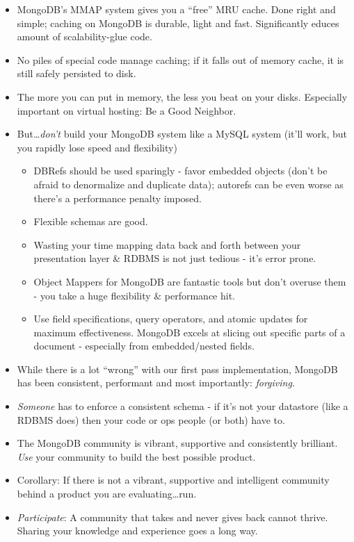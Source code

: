 \documentclass{beamer}
\newenvironment{itemizeframe}
               {\begin{frame}\startitemizeframe} 
               {\stopitemizeframe\end{frame}}
\newenvironment{itemizecodeframe}
              {\begin{frame}[allowframebreaks,allowdisplaybreaks]
              \startitemizeframe} 
              {\stopitemizeframe\end{frame}}
\newcommand\startitemizeframe{\begin{itemize}} \newcommand\stopitemizeframe{\end{itemize}}
\begin{document}
\begin{itemizecodeframe}
    \frametitle{As long as I'm being hyperbolic\ldots}
    \framesubtitle{MongoDB is a bionic leg replacement\ldots}
	\item MongoDB's MMAP system gives you a ``free'' MRU cache. Done right and simple; caching on MongoDB is durable, light and fast. Significantly educes amount of scalability-glue code.
	\item No piles of special code manage caching; if it falls out of memory cache, it is still safely persisted to disk.   
	\item The more you can put in memory, the less you beat on your disks. Especially important on virtual hosting: Be a Good Neighbor.
	\item But\ldots {\em don't} build your MongoDB system like a MySQL system (it'll work, but you rapidly lose speed and flexibility)
	\newpage
	\begin{itemize}
    	\item DBRefs should be used sparingly - favor embedded objects (don't be afraid to denormalize and duplicate data); autorefs can be even worse as there's a performance penalty imposed.
		\item Flexible schemas are good.
		\item Wasting your time mapping data back and forth between your presentation layer \& RDBMS is not just tedious - it's error prone.
		\item Object Mappers for MongoDB are fantastic tools but don't overuse them - you take a huge flexibility \& performance hit.  
		\item Use field specifications, query operators, and atomic updates for maximum effectiveness.  MongoDB excels at slicing out specific parts of a document - especially from embedded/nested fields.
	\end{itemize}
\end{itemizecodeframe}

\begin{itemizeframe}
    \frametitle{Caveats}
	\item While there is a lot ``wrong'' with our first pass implementation, MongoDB has been consistent, performant and most importantly: {\em forgiving}.
	\item {\em Someone} has to enforce a consistent schema - if it's not your datastore (like a RDBMS does) then your code or ops people (or both) have to.
	\item The MongoDB community is vibrant, supportive and consistently brilliant. {\em Use} your community to build the best possible product. 
	\item Corollary: If there is not a vibrant, supportive and intelligent community behind a product you are evaluating\ldots run. 
	\item {\em Participate}: A community that takes and never gives back cannot thrive.  Sharing your knowledge and experience goes a long way.
\end{itemizeframe}
\end{document}
